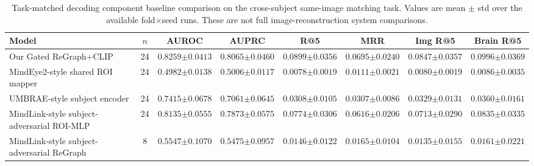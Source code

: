 \documentclass{article}
\begin{document}
\begin{table}[!htbp]
  \centering
  \caption{Task-matched decoding component baseline comparison on the cross-subject same-image matching task. Values are mean $\pm$ std over the available fold$\times$seed runs. These are not full image-reconstruction system comparisons.}
  \label{tab:sota_baselines}
  \scriptsize
  \setlength{\tabcolsep}{2.8pt}
  \renewcommand{\arraystretch}{1.15}
  \begin{tabular}{lccccccc}
    \toprule
    Model & $n$ & AUROC & AUPRC & R@5 & MRR & Img R@5 & Brain R@5 \\
    \midrule
    Our Gated ReGraph+CLIP
    & 24 & $\mathbf{0.8259{\scriptstyle\pm0.0413}}$ & $\mathbf{0.8065{\scriptstyle\pm0.0460}}$ & $\mathbf{0.0899{\scriptstyle\pm0.0356}}$ & $\mathbf{0.0695{\scriptstyle\pm0.0240}}$ & $\mathbf{0.0847{\scriptstyle\pm0.0357}}$ & $\mathbf{0.0996{\scriptstyle\pm0.0369}}$ \\
    MindEye2-style shared ROI mapper
    & 24 & $0.4982{\scriptstyle\pm0.0138}$ & $0.5006{\scriptstyle\pm0.0117}$ & $0.0078{\scriptstyle\pm0.0019}$ & $0.0111{\scriptstyle\pm0.0021}$ & $0.0080{\scriptstyle\pm0.0019}$ & $0.0086{\scriptstyle\pm0.0035}$ \\
    UMBRAE-style subject encoder
    & 24 & $0.7415{\scriptstyle\pm0.0678}$ & $0.7061{\scriptstyle\pm0.0645}$ & $0.0308{\scriptstyle\pm0.0105}$ & $0.0307{\scriptstyle\pm0.0086}$ & $0.0329{\scriptstyle\pm0.0131}$ & $0.0360{\scriptstyle\pm0.0161}$ \\
    MindLink-style subject-adversarial ROI-MLP
    & 24 & $0.8135{\scriptstyle\pm0.0555}$ & $0.7873{\scriptstyle\pm0.0575}$ & $0.0774{\scriptstyle\pm0.0306}$ & $0.0616{\scriptstyle\pm0.0206}$ & $0.0713{\scriptstyle\pm0.0290}$ & $0.0835{\scriptstyle\pm0.0335}$ \\
    MindLink-style subject-adversarial ReGraph
    & 8 & $0.5547{\scriptstyle\pm0.1070}$ & $0.5475{\scriptstyle\pm0.0957}$ & $0.0146{\scriptstyle\pm0.0122}$ & $0.0165{\scriptstyle\pm0.0104}$ & $0.0135{\scriptstyle\pm0.0155}$ & $0.0161{\scriptstyle\pm0.0221}$ \\
    \bottomrule
  \end{tabular}
\end{table}
\end{document}
